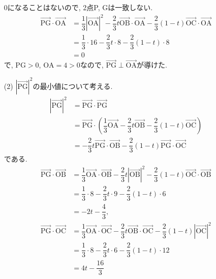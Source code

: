 \documentclass[dvipdfmx,a4paper]{jsarticle}
\newcommand{\oraw}{\overrightarrow}
\newcommand{\2}{I\hspace{-1pt}I}
\newcommand{\3}{I\hspace{-1pt}I\hspace{-1pt}I}
\begin{document}
\begin{itemize}
        0になることはないので, 2点P, Gは一致しない. 
        \begin{align*}
            \oraw{\mathrm{PG}} \cdot \oraw{\mathrm{OA}} &=
            \dfrac{1}{3}|\oraw{\mathrm{OA}}|^2 
            - \dfrac{2}{3}t\oraw{\mathrm{OB}} \cdot \oraw{\mathrm{OA}} 
            - \dfrac{2}{3} (1-t)\oraw{\mathrm{OC}} \cdot \oraw{\mathrm{OA}} \\
            &= \dfrac{1}{3} \cdot 16 - \dfrac{2}{3}t \cdot 8 - \dfrac{2}{3} (1-t) \cdot 8 \\
            &= 0
        \end{align*}
        で, $\mathrm{PG} >0$, $\mathrm{OA}=4>0$なので, 
        $\oraw{\mathrm{PG}} \perp \oraw{\mathrm{OA}}$が導けた. 

        \item [(2)] $|\oraw{\mathrm{PG}}|^2$の最小値について考える. 
        \begin{align*}
            |\oraw{\mathrm{PG}}|^2 &= \oraw{\mathrm{PG}} \cdot \oraw{\mathrm{PG}} \\
            &= \oraw{\mathrm{PG}} \cdot \left(\dfrac{1}{3}\oraw{\mathrm{OA}} - \dfrac{2}{3}t\oraw{\mathrm{OB}} - \dfrac{2}{3} (1-t)\oraw{\mathrm{OC}} \right) \\
            &= - \dfrac{2}{3}t \oraw{\mathrm{PG}} \cdot \oraw{\mathrm{OB}} - \dfrac{2}{3} (1-t) \oraw{\mathrm{PG}} \cdot \oraw{\mathrm{OC}}
        \end{align*}
        である. 
        \begin{align*}
            \oraw{\mathrm{PG}} \cdot \oraw{\mathrm{OB}} &=
            \dfrac{1}{3}\oraw{\mathrm{OA}} \cdot \oraw{\mathrm{OB}} 
            - \dfrac{2}{3}t |\oraw{\mathrm{OB}}|^2
            - \dfrac{2}{3} (1-t)\oraw{\mathrm{OC}} \cdot \oraw{\mathrm{OB}} \\
            &= \dfrac{1}{3} \cdot 8 - \dfrac{2}{3}t \cdot 9 - \dfrac{2}{3} (1-t) \cdot 6 \\
            &= -2t - \dfrac{4}{3}, \\
            \oraw{\mathrm{PG}} \cdot \oraw{\mathrm{OC}} &=
            \dfrac{1}{3}\oraw{\mathrm{OA}} \cdot \oraw{\mathrm{OC}} 
            - \dfrac{2}{3}t \oraw{\mathrm{OB}} \cdot \oraw{\mathrm{OC}} 
            - \dfrac{2}{3} (1-t) |\oraw{\mathrm{OC}}|^2 \\
            &= \dfrac{1}{3} \cdot 8 - \dfrac{2}{3}t \cdot 6 - \dfrac{2}{3} (1-t) \cdot 12 \\
            &= 4t - \dfrac{16}{3} \\
        \end{align*}

\end{itemize}
\end{document}
